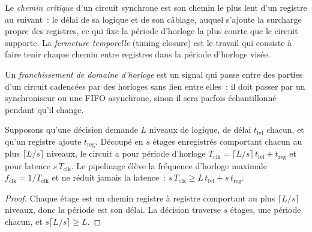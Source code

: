 \begin{definition}\label{def:nw:programmable-hardware-i-architecture-and-toolchain:timing}
Le \emph{chemin critique} d'un circuit synchrone est son chemin le plus lent d'un registre au suivant~: le délai
de sa logique et de son câblage, auquel s'ajoute la surcharge propre des registres, ce qui fixe la période d'horloge la plus courte que le circuit supporte. La \emph{fermeture
temporelle} (timing closure) est le travail qui consiste à faire tenir chaque chemin entre registres dans la période d'horloge visée.
\end{definition}

\begin{definition}\label{def:nw:programmable-hardware-i-architecture-and-toolchain:cdc}
Un \emph{franchissement de domaine d'horloge} est un signal qui passe entre des parties d'un circuit cadencées par des horloges sans lien entre elles~;
il doit passer par un synchroniseur ou une FIFO asynchrone, sinon il sera parfois échantillonné pendant qu'il change.
\end{definition}

\begin{proposition}\label{prop:nw:programmable-hardware-i-architecture-and-toolchain:pipe}
Supposons qu'une décision demande $L$ niveaux de logique, de délai $t_{\mathrm{lvl}}$ chacun, et qu'un registre ajoute $t_{\mathrm{reg}}$. Découpé en $s$
étages enregistrés comportant chacun au plus $\lceil L/s\rceil$ niveaux, le circuit a pour période d'horloge $T_{\mathrm{clk}} = \lceil L/s\rceil\,t_{\mathrm{lvl}}
+ t_{\mathrm{reg}}$ et pour latence $s\,T_{\mathrm{clk}}$. Le pipelinage élève la fréquence d'horloge maximale $f_{\mathrm{clk}} = 1/T_{\mathrm{clk}}$
et ne réduit jamais la latence~: $s\,T_{\mathrm{clk}} \ge L\,t_{\mathrm{lvl}} + s\,t_{\mathrm{reg}}$.
\end{proposition}

\begin{proof}
Chaque étage est un chemin registre à registre comportant au plus $\lceil L/s\rceil$ niveaux, donc la période est son délai. La décision traverse $s$
étages, une période chacun, et $s\lceil L/s\rceil \ge L$.
\end{proof}

